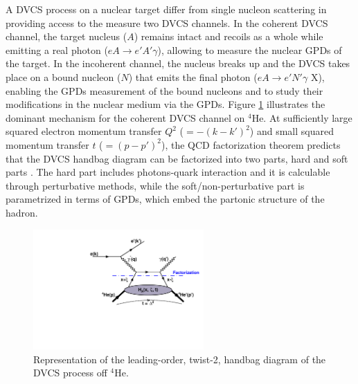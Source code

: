 \documentclass[nofootinbib,twocolumn,showpacs,prl,superscriptaddress,secnumarabic,amssymb,nobibnotes,aps,floatfix]{revtex4}
\begin{document}
A DVCS process on a nuclear target differ from single nucleon scattering in 
providing access to the measure two DVCS channels. In the coherent DVCS 
channel, the target nucleus ($A$) remains intact and recoils as a whole while 
emitting a real photon ($eA \rightarrow e' A' \gamma$), allowing to measure the 
nuclear GPDs of the target. In the incoherent channel, the nucleus breaks up 
and the DVCS takes place on a bound nucleon ($N$) that emits the final photon 
($eA \rightarrow e' N' \gamma$ X), enabling the GPDs measurement of the bound 
nucleons and to study their modifications in the nuclear medium via the GPDs.  
Figure \ref{fig:diags} illustrates the dominant mechanism for the coherent DVCS 
channel on $^4$He. At sufficiently large squared electron momentum transfer 
$Q^2$ ($= -(k-k')^{2}$) and small squared momentum transfer $t$ ($= 
(p-p')^{2}$), the QCD factorization theorem predicts that the DVCS handbag 
diagram can be factorized into two parts, hard and soft parts 
\cite{Freund_Collins,Ji_Osborne}. The hard part includes photons-quark 
interaction and it is calculable through perturbative methods, while the 
soft/non-perturbative part is parametrized in terms of GPDs, which embed the 
partonic structure of the hadron.  
\begin{figure}[tb]
\includegraphics[width=6.5cm]{figs/DVCS_diagram.pdf}
\caption{Representation of the leading-order, twist-2, handbag diagram of the 
DVCS process off $^4$He.}
\label{fig:diags}
\end{figure}
\end{document}
